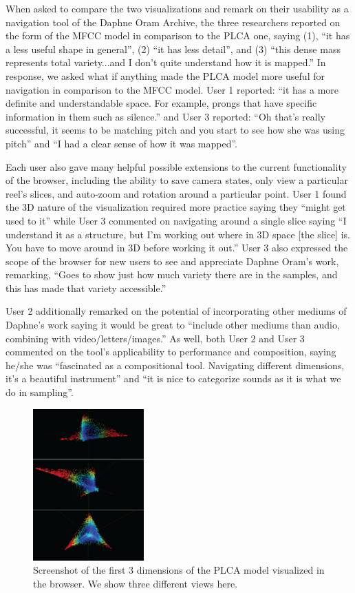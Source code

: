 When asked to compare the two visualizations and remark on their usability as a navigation tool of the Daphne Oram Archive, the three researchers reported on the form of the MFCC model in comparison to the PLCA one, saying (1), ``it has a less useful shape in general'', (2) ``it has less detail'', and (3) ``this dense mass represents total variety...and I don't quite understand how it is mapped.''  In response, we asked what if anything made the PLCA model more useful for navigation in comparison to the MFCC model.  User 1 reported: ``it has a more definite and understandable space. For example, prongs that have specific information in them such as silence.'' and User 3 reported: ``Oh that's really successful, it seems to be matching pitch and you start to see how she was using pitch'' and ``I had a clear sense of how it was mapped''. 

Each user also gave many helpful possible extensions to the current functionality of the browser, including the ability to save camera states, only view a particular reel's slices, and auto-zoom and rotation around a particular point.  User 1 found the 3D nature of the visualization required more practice saying they ``might get used to it'' while User 3 commented on navigating around a single slice saying ``I understand it as a structure, but I'm working out where in 3D space [the slice] is.  You have to move around in 3D before working it out.''   User 3 also expressed the scope of the browser for new users to see and appreciate Daphne Oram's work, remarking, ``Goes to show just how much variety there are in the samples, and this has made that variety accessible.''  

User 2 additionally remarked on the potential of incorporating other mediums of Daphne's work saying it would be great to ``include other mediums than audio, combining with video/letters/images.''  As well, both User 2 and User 3 commented on the tool's applicability to performance and composition, saying he/she was ``fascinated as a compositional tool.  Navigating different dimensions, it's a beautiful instrument'' and ``it is nice to categorize sounds as it is what we do in sampling''.  

\begin{figure}
  \centering
  \includegraphics[width=0.38\textwidth]{images/plca-all.png}
  \caption{Screenshot of the first 3 dimensions of the PLCA model visualized in the browser.  We show three different views here.}
  \label{fig:plca}
\end{figure}

